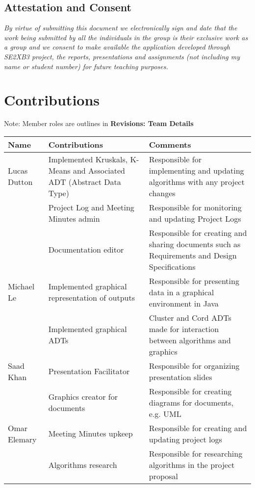 \documentclass[12pt]{article}
\begin{document}
\subsection{Attestation and Consent}

\textit{By virtue of submitting this document we electronically sign
and date that the work being submitted by all the individuals in the 
group is their exclusive work as a group and we consent to make
available the application developed through SE2XB3 project, the 
reports, presentations and assignments (not including my name or 
student number) for future teaching purposes.}

\newpage

\section{Contributions}
Note: Member roles are outlines in \textbf{Revisions: Team Details}

\begin{table}[h]
\begin{tabularx}{\textwidth}{|l|X|X|}
\hline
Name & Contributions & Comments \\
\hline
Lucas Dutton & Implemented Kruskals, K-Means and Associated ADT
               (Abstract Data Type)
             & Responsible for implementing and updating algorithms
               with any project changes\\
\cline{2-3}
~ & Project Log and Meeting Minutes admin 
  & Responsible for monitoring and updating Project Logs\\
\cline{2-3}
~ & Documentation editor
  & Responsible for creating and sharing documents such as 
    Requirements and Design Specifications\\
\hline
Michael Le & Implemented graphical representation of outputs
           & Responsible for presenting data in a graphical
             environment in Java\\
\cline{2-3}
~ & Implemented graphical ADTs 
  & Cluster and Cord ADTs made for interaction between algorithms
    and graphics\\
\hline
Saad Khan & Presentation Facilitator 
          & Responsible for organizing presentation slides\\
\cline{2-3}
~ & Graphics creator for documents 
  & Responsible for creating diagrams for documents, e.g. UML\\
\hline
Omar Elemary & Meeting Minutes upkeep
             & Responsible for creating and updating project logs\\
\cline{2-3}
~ & Algorithms research
  & Responsible for researching algorithms in the project proposal\\
\hline
\end{tabularx}
\end{table}
\end{document}
